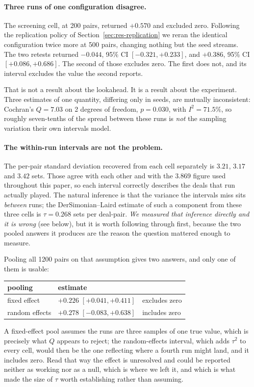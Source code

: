 \documentclass[11pt,letterpaper]{article}
\begin{document}
\paragraph{Three runs of one configuration disagree.} The screening cell, at 200
pairs, returned $+0.570$ and excluded zero. Following the replication policy of
Section~\ref{sec:res-replication} we reran the identical configuration twice
more at 500 pairs, changing nothing but the seed streams. The two retests
returned $-0.044$, 95\% CI $[-0.321, +0.233]$, and $+0.386$, 95\% CI
$[+0.086, +0.686]$. The second of those excludes zero. The first does not, and
its interval excludes the value the second reports.

That is not a result about the lookahead. It is a result about the experiment.
Three estimates of one quantity, differing only in seeds, are mutually
inconsistent: Cochran's $Q = 7.03$ on 2 degrees of freedom, $p = 0.030$, with
$I^2 = 71.5\%$, so roughly seven-tenths of the spread between these runs is
\emph{not} the sampling variation their own intervals model.

\paragraph{The within-run intervals are not the problem.} The per-pair standard
deviation recovered from each cell separately is $3.21$, $3.17$ and $3.42$ sets.
Those agree with each other and with the $3.869$ figure used throughout this
paper, so each interval correctly describes the deals that run actually played.
The natural inference is that the variance the intervals miss sits \emph{between}
runs; the DerSimonian--Laird estimate of such a component from these three cells
is $\tau = 0.268$ sets per deal-pair. \emph{We measured that inference directly
and it is wrong} (see below), but it is worth following through first,
because the two pooled answers it produces are the reason the question mattered
enough to measure.

Pooling all 1200 pairs on that assumption gives two answers, and only one of
them is usable:
\begin{center}
\begin{tabular}{lll}
\toprule
pooling & estimate & \\
\midrule
fixed effect   & $+0.226$ $[+0.041, +0.411]$ & excludes zero \\
random effects & $+0.278$ $[-0.083, +0.638]$ & includes zero \\
\bottomrule
\end{tabular}
\end{center}
A fixed-effect pool assumes the runs are three samples of one true value, which
is precisely what $Q$ appears to reject; the random-effects interval, which adds
$\tau^2$ to every cell, would then be the one reflecting where a fourth run might
land, and it includes zero. Read that way the effect is unresolved and could be
reported neither as working nor as a null, which is where we left it, and
which is what made the size of $\tau$ worth establishing rather than assuming.
\end{document}

